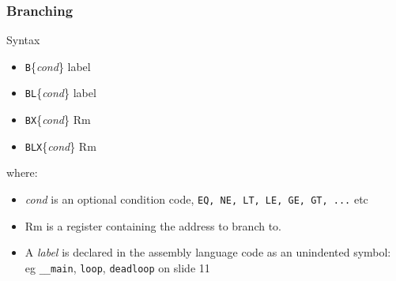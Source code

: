 \documentclass[10pt]{beamer}
\begin{document}
\begin{frame}
\frametitle{Branching}
Syntax
\begin{itemize}
\item \texttt{B}\{\textit{cond}\} label
\item \texttt{BL}\{\textit{cond}\} label
\item \texttt{BX}\{\textit{cond}\} Rm
\item \texttt{BLX}\{\textit{cond}\} Rm
\end{itemize}

where:
\begin{itemize}
\item \textit{cond} is an optional condition code, \texttt{EQ, NE, LT, LE, GE, GT, ...} etc
\item Rm is a register containing the address to branch to.
\item A \emph{label} is declared in the assembly language code as an unindented symbol: eg \texttt{\color{blue}\_\_main}, \texttt{\color{blue}loop}, \texttt{\color{blue}deadloop} on slide 11
\end{itemize}
\end{frame}
\end{document}
